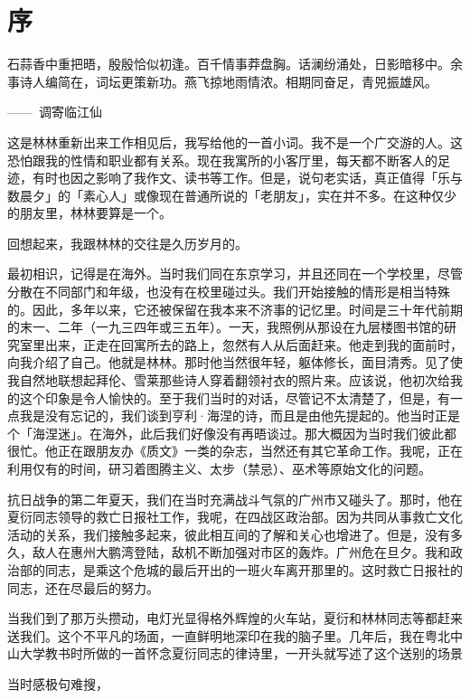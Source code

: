 
\chapter{\FK 序}

 {\FS

  \hfill\parbox{0.5\textwidth}{\FK
      石蒜香中重把晤，殷殷恰似初逢。百千情事莽盘胸。话澜纷涌处，日影暗移中。余事诗人编简在，词坛更策新功。燕飞掠地雨情浓\footnotemark[1]。相期同奋足，青兕振雄风。

      \hfill——~调寄临江仙
  }


  \bigskip

  这是林林重新出来工作相见后，我写给他的一首小词。我不是一个广交游的人。这恐怕跟我的性情和职业都有关系。现在我寓所的小客厅里，每天都不断客人的足迹，有时也因之影响了我作文、读书等工作。但是，说句老实话，真正值得「乐与数晨夕」的「素心人」或像现在普通所说的「老朋友」，实在并不多。在这种仅少的朋友里，林林要算是一个。

  回想起来，我跟林林的交往是久历岁月的。

  最初相识，记得是在海外。当时我们同在东京学习，并且还同在一个学校里，尽管分散在不同部门和年级，也没有在校里碰过头。我们开始接触的情形是相当特殊的。因此，多年以来，它还被保留在我本来不济事的记忆里。时间是三十年代前期的末一、二年（一九三四年或三五年）。一天，我照例从那设在九层楼图书馆的研究室里出来，正走在回寓所去的路上，忽然有人从后面赶来。他走到我的面前时，向我介绍了自己。他就是林林。那时他当然很年轻，躯体修长，面目清秀。见了使我自然地联想起拜伦、雪莱那些诗人穿着翻领衬衣的照片来。应该说，他初次给我的这个印象是令人愉快的。至于我们当时的对话，尽管记不太清楚了，但是，有一点我是没有忘记的，我们谈到亨利·海涅的诗，而且是由他先提起的。他当时正是个「海涅迷」。在海外，此后我们好像没有再晤谈过。那大概因为当时我们彼此都很忙。他正在跟朋友办《质文》一类的杂志，当然还有其它革命工作。我呢，正在利用仅有的时间，研习着图腾主义、太步（禁忌）、巫术等原始文化的问题。

  抗日战争的第二年夏天，我们在当时充满战斗气氛的广州市又碰头了。那时，他在夏衍同志领导的救亡日报社工作，我呢，在四战区政治部。因为共同从事救亡文化活动的关系，我们接触多起来，彼此相互间的了解和关心也增进了。但是，没有多久，敌人在惠州大鹏湾登陆，敌机不断加强对市区的轰炸。广州危在旦夕。我和政治部的同志，是乘这个危城的最后开出的一班火车离开那里的。这时救亡日报社的同志，还在尽最后的努力。

  当我们到了那万头攒动，电灯光显得格外辉煌的火车站，夏衍和林林同志等都赶来送我们。这个不平凡的场面，一直鲜明地深印在我的脑子里。几年后，我在粤北中山大学教书时所做的一首怀念夏衍同志的律诗里，一开头就写述了这个送别的场景
  \begin{center}
      当时感极句难搜，


\end{center}}
